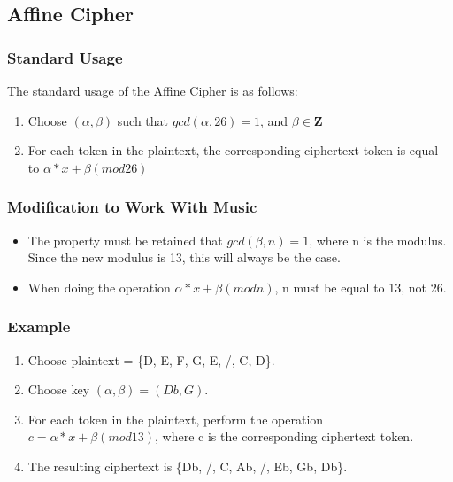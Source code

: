 \documentclass[14pt]{article}
\begin{document}
        \subsection{Affine Cipher}
            \subsubsection{Standard Usage}
            The standard usage of the Affine Cipher is as follows:
            \begin{enumerate}
                \item Choose $(\alpha, \beta)$ such that $gcd(\alpha, 26) = 1$, and $\beta \in \mathbf{Z}$
                \item For each token in the plaintext, the corresponding ciphertext token is equal to $\alpha * x + \beta (mod 26)$
            \end{enumerate}
            \cite{Trappe}
            
            \subsubsection{Modification to Work With Music}
            \begin{itemize}
                \item The property must be retained that $gcd(\beta, n) = 1$, where n is the modulus. Since the new modulus is 13, this will always be the case.
                \item When doing the operation $\alpha * x + \beta (mod n)$, n must be equal  to 13, not 26.
            \end{itemize}

            \subsubsection{Example}
            \begin{enumerate}
                \item Choose plaintext = \{D, E, F, G, E, /, C, D\}.
                \item Choose key $(\alpha, \beta) = (Db, G)$.
                \item For each token in the plaintext, perform the operation $c = \alpha * x + \beta (mod 13)$, where c is the corresponding ciphertext token.
                \item The resulting ciphertext is \{Db, /, C, Ab, /, Eb, Gb, Db\}.
            \end{enumerate}
\end{document}
